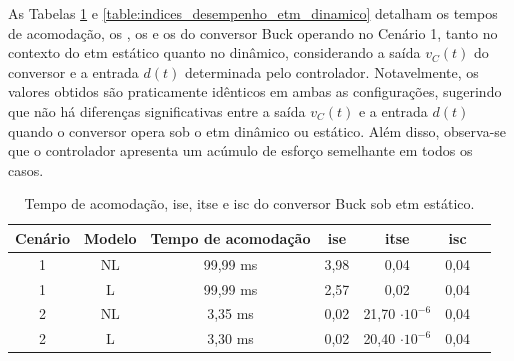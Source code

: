 As Tabelas \ref{table:indices_desempenho_etm_estático} e \ref{table:indices_desempenho_etm_dinamico} detalham os tempos de acomodação, os , os  e os  do conversor Buck operando no Cenário 1, tanto no contexto do \acrshort{etm} estático quanto no dinâmico, considerando a saída $v_C(t)$ do conversor e a entrada $d(t)$ determinada pelo controlador. Notavelmente, os valores obtidos são praticamente idênticos em ambas as configurações, sugerindo que não há diferenças significativas entre a saída $v_C(t)$ e a entrada $d(t)$ quando o conversor opera sob o \acrshort{etm} dinâmico ou estático. Além disso, observa-se que o controlador apresenta um acúmulo de esforço semelhante em todos os casos. 

\vspace{8pt}
\begin{table}[H]
  \centering
  \captionsetup{justification=centering}
  \setlength{\tabcolsep}{10pt}
  \begin{tabular}{ccccccc}
    \toprule
    Cenário & Modelo      & Tempo de acomodação & \acrshort{ise} & \acrshort{itse}       & \acrshort{isc} \\
    \midrule
    1       & NL  & 99,99 ms            & 3,98           & 0,04                  & 0,04           \\
    1       & L & 99,99 ms            & 2,57           & 0,02                  & 0,04           \\
    2       & NL  & 3,35 ms             & 0,02           & 21,70 $\cdot 10^{-6}$ & 0,04           \\
    2       & L & 3,30 ms             & 0,02           & 20,40 $\cdot 10^{-6}$ & 0,04           \\
    \bottomrule
  \end{tabular}
  \caption{Tempo de acomodação, \acrshort{ise}, \acrshort{itse} e \acrshort{isc} do conversor Buck sob \acrshort{etm} estático.}
  \label{table:indices_desempenho_etm_estático}
\end{table}

